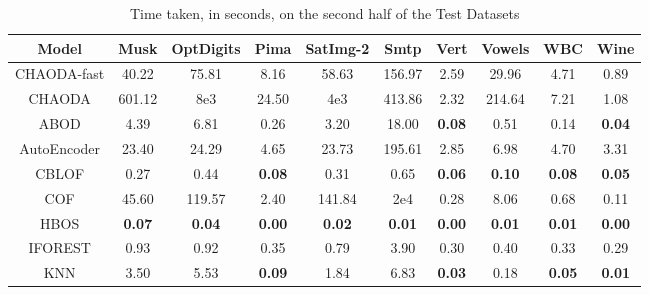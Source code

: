 \begin{table}[!t]
\renewcommand{\arraystretch}{1.15}
\caption{Time taken, in seconds, on the second half of the Test Datasets}
\label{supplement:table:results:test-time-2}
\vskip 0.15in
\begin{center}
\begin{small}
\begin{tabular}{|c|c|c|c|c|c|c|c|c|c|}
\hline
\textbf{Model} & \textbf{Musk} & \textbf{OptDigits} & \textbf{Pima} & \textbf{SatImg-2} & \textbf{Smtp} & \textbf{Vert} & \textbf{Vowels} & \textbf{WBC} & \textbf{Wine} \\
\hline
CHAODA-fast    & 40.22         & 75.81              & 8.16          & 58.63             & 156.97        & 2.59          & 29.96           & 4.71          & 0.89          \\
\hline
CHAODA         & 601.12        & 8e3                & 24.50         & 4e3               & 413.86        & 2.32          & 214.64          & 7.21          & 1.08          \\
\hline
ABOD &          4.39 &               6.81 &          0.26 &                3.20 &         18.00 &      \textbf{0.08} &            0.51 &          0.14 & \textbf{0.04} \\
\hline
AutoEncoder &         23.40 &              24.29 &          4.65 &               23.73 &        195.61 &               2.85 &            6.98 &          4.70 &          3.31 \\
\hline
CBLOF &          0.27 &               0.44 & \textbf{0.08} &                0.31 &          0.65 &      \textbf{0.06} &   \textbf{0.10} & \textbf{0.08} & \textbf{0.05} \\
\hline
COF &         45.60 &             119.57 &          2.40 &              141.84 &      2e4 &               0.28 &            8.06 &          0.68 &          0.11 \\
\hline
HBOS & \textbf{0.07} &      \textbf{0.04} & \textbf{0.00} &       \textbf{0.02} & \textbf{0.01} &      \textbf{0.00} &   \textbf{0.01} & \textbf{0.01} & \textbf{0.00} \\
\hline
IFOREST &          0.93 &               0.92 &          0.35 &                0.79 &          3.90 &               0.30 &            0.40 &          0.33 &          0.29 \\
\hline
KNN &          3.50 &               5.53 & \textbf{0.09} &                1.84 &          6.83 &      \textbf{0.03} &            0.18 & \textbf{0.05} & \textbf{0.01} \\

\end{tabular}
\end{small}
\end{center}
\end{table}
